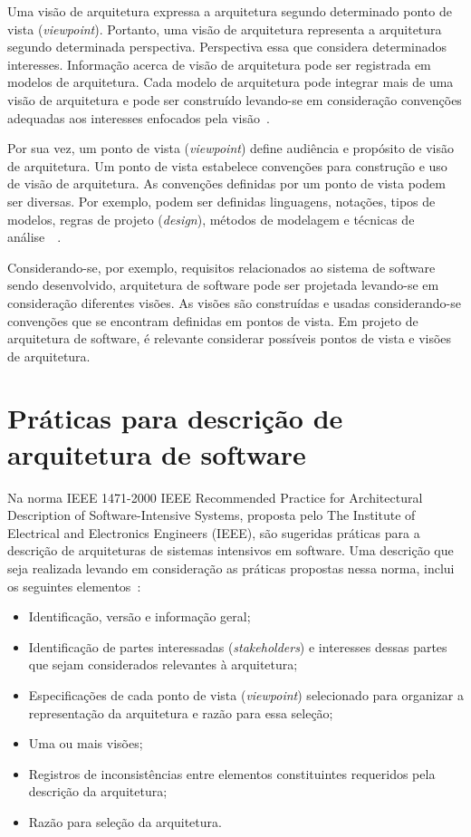 Uma visão de arquitetura expressa a arquitetura segundo determinado ponto de vista (\emph{viewpoint}). Portanto, uma visão de arquitetura representa a arquitetura segundo determinada perspectiva. Perspectiva essa que considera determinados interesses. Informação acerca de visão de arquitetura pode ser registrada em modelos de arquitetura. Cada modelo de arquitetura pode integrar mais de uma visão de arquitetura e pode ser construído levando-se em consideração convenções adequadas aos interesses enfocados pela visão~\cite{ISO_42010}. 

Por sua vez, um ponto de vista (\emph{viewpoint}) define audiência e propósito de visão de arquitetura. Um ponto de vista estabelece convenções para construção e uso de visão de arquitetura. As convenções definidas por um ponto de vista podem ser diversas. Por exemplo, podem ser definidas linguagens, notações, tipos de modelos, regras de projeto (\emph{design}), métodos de modelagem e técnicas de análise~\cite{ISO_1471}~\cite{ISO_42010}. 

Considerando-se, por exemplo, requisitos relacionados ao sistema de software sendo desenvolvido, arquitetura de software pode ser projetada levando-se em consideração diferentes visões. As visões são construídas e usadas considerando-se convenções que se encontram definidas em pontos de vista. Em projeto de arquitetura de software, é relevante considerar possíveis pontos de vista e visões de arquitetura.


\section{Práticas para descrição de arquitetura de software}

Na norma IEEE 1471-2000 IEEE Recommended Practice for Architectural Description of Software-Intensive Systems, proposta pelo The Institute of Electrical and Electronics Engineers (IEEE), são sugeridas práticas para a descrição de arquiteturas de sistemas intensivos em software. Uma descrição que seja realizada levando em consideração as práticas propostas nessa norma, inclui os seguintes elementos~\cite{ISO_1471}:

\begin{itemize}
    \item Identificação, versão e informação geral;
    \item Identificação de partes interessadas (\emph{stakeholders}) e interesses dessas partes que sejam considerados relevantes à arquitetura;
    \item Especificações de cada ponto de vista (\emph{viewpoint}) selecionado para organizar a representação da arquitetura e razão para essa seleção;
    \item Uma ou mais visões;
    \item Registros de inconsistências entre elementos  constituintes requeridos pela descrição da arquitetura;
    \item Razão para seleção da arquitetura.
\end{itemize}

